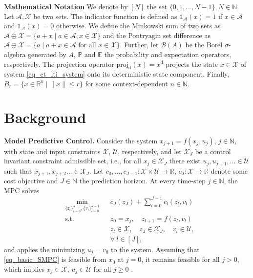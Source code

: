 \documentclass{IEEEtran}
\begin{document}
\textbf{Mathematical Notation}
We denote by $[N]$ the set $\{0,1,\dots,N-1\},N\in\mathbb{N}$.  Let $\mathcal{A}, \mathcal{X}$ be two sets. The indicator function is defined as $\mathds{1}_{\mathcal{A}}(x)=1$ if $x\in {\mathcal{A}}$ and $\mathds{1}_{\mathcal{A}}(x)=0$ otherwise. We define the Minkowski sum of two sets as $\mathcal{A} \oplus \mathcal{X} = \{ a + x \mid a \in \mathcal{A}, x \in \mathcal{X} \}$ and the Pontryagin set difference as $\mathcal{A} \ominus \mathcal{X} = \{ a \mid a + x \in \mathcal{A} \text{ for all } x \in \mathcal{X} \}$. 
Further, let $\mathcal{B}(A)$ be the Borel $\sigma$-algebra generated by $A$, $\mathbb{P}$ and $\mathbb{E}$ the probability and expectation operators, respectively. The projection operator $\text{proj}_{\text{d}}(x)=x^{\text{d}}$ projects the state $x\in\mathcal{X}$ of system \eqref{eq_ct_lti_system} onto its deterministic state component. Finally, $B_r=\{x\in\mathbb{R}^n\ | \ \|x\|\leq r\}$ for some context-dependent $n\in\mathbb{N}$. 

\section{Background}
\label{sec_back}
\textbf{Model Predictive Control.}
Consider the system $x_{j+1} = f(x_j,u_j)$, $j\in\mathbb{N}$, with state and input constraints $\mathcal{X}$, $\mathcal{U}$, respectively, and let $\mathcal{X}_J$ be a control invariant constraint admissible set, i.e., for all $x_j\in\mathcal{X}_J$ there exist $u_j,u_{j+1},\dots\in\mathcal{U}$ such that $x_{j+1},x_{j+2}\dots\in\mathcal{X}_J$. Let $c_0,\dots,c_{J-1}:\mathcal{X}\times\mathcal{U}\rightarrow\mathbb{R}$, $c_J:\mathcal{X}\rightarrow\mathbb{R}$ denote some cost objective and $J\in\mathbb{N}$ the prediction horizon. At every time-step $j\in\mathbb{N}$, the MPC solves
\begin{subequations}
    \label{eq_basic_SMPC}
    \begin{align}
        &\min_{\{z_l\}_{l=0}^J, \{v_l\}_{l=0}^{J-1}} && c_J(z_J) + \sum_{l=0}^{J-1} c_l(z_l,v_l) \\
        &\text{s.t.} && z_0 = x_j, \quad  z_{l+1} = f(z_l, v_l) \\
        &&& z_l\in\mathcal{X},\quad z_J \in\mathcal{X}_J, \quad v_l\in\mathcal{U},\\
        &&& \forall \ l\in[J],
    \end{align}
\end{subequations}
and applies the minimizing $u_j=v_0$ to the system. Assuming that \eqref{eq_basic_SMPC} is feasible from $x_0$ at $j=0$, it remains feasible for all $j> 0$, which implies $x_j\in\mathcal{X}$, $u_j\in\mathcal{U}$ for all $j\geq 0$ \cite{rawlings2020model}. 
\end{document}
